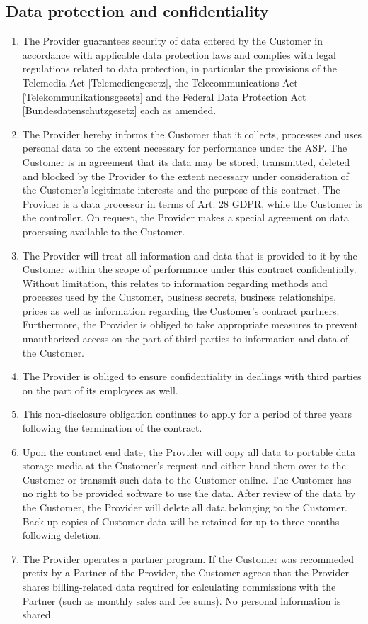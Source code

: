 \documentclass{terms}
\begin{document}
\subsection{Data protection and confidentiality}
\begin{enumerate}
\item The Provider guarantees security of data entered by the Customer in accordance with applicable data protection laws and complies with legal regulations related to data protection, in particular the provisions of the Telemedia Act [Telemediengesetz], the Telecommunications Act [Telekommunikationsgesetz] and the Federal Data Protection Act [Bundesdatenschutzgesetz] each as amended.
\item The Provider hereby informs the Customer that it collects, processes and uses personal data to the extent necessary for performance under the ASP. The Customer is in agreement that its data may be stored, transmitted, deleted and blocked by the Provider to the extent necessary under consideration of the Customer's legitimate interests and the purpose of this contract. The Provider is a data processor in terms of Art. 28 GDPR, while the Customer is the controller. On request, the Provider makes a special agreement on data processing available to the Customer.
\item The Provider will treat all information and data that is provided to it by the Customer within the scope of performance under this contract confidentially. Without limitation, this relates to information regarding methods and processes used by the Customer, business secrets, business relationships, prices as well as information regarding the Customer's contract partners. Furthermore, the Provider is obliged to take appropriate measures to prevent unauthorized access on the part of third parties to information and data of the Customer.
\item The Provider is obliged to ensure confidentiality in dealings with third parties on the part of its employees as well.
\item This non-disclosure obligation continues to apply for a period of three years following the termination of the contract. 
\item Upon the contract end date, the Provider will copy all data to portable data storage media at the Customer's request and either hand them over to the Customer or transmit such data to the Customer online. The Customer has no right to be provided software to use the data. After review of the data by the Customer, the Provider will delete all data belonging to the Customer. Back-up copies of Customer data will be retained for up to three months following deletion.
\item The Provider operates a partner program. If the Customer was recommeded pretix by a Partner of the Provider, the Customer agrees that the Provider shares billing-related data required for calculating commissions with the Partner (such as monthly sales and fee sums). No personal information is shared.
\end{enumerate}
\end{document}
